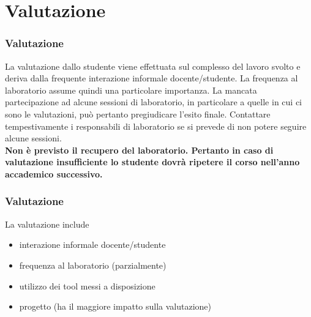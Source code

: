 \documentclass{beamer}
\begin{document}
\section{Valutazione}
\begin{frame}
\frametitle{Valutazione}
La valutazione dallo studente viene effettuata sul complesso del lavoro svolto e deriva dalla frequente interazione informale docente/studente. La frequenza al laboratorio assume quindi una particolare importanza. La mancata partecipazione ad alcune sessioni di laboratorio, in particolare a quelle in cui ci sono le valutazioni, pu\` o pertanto pregiudicare l'esito finale. Contattare tempestivamente i responsabili di laboratorio se si prevede di non potere seguire alcune sessioni.\\

\textbf{Non \`e previsto il recupero del laboratorio. Pertanto in caso di valutazione insufficiente lo studente dovr\`a ripetere il corso nell'anno accademico successivo.}
\end{frame}


\begin{frame}
\frametitle{Valutazione}
La valutazione include
\begin{itemize}
\item  interazione informale docente/studente
\item frequenza al laboratorio (parzialmente)
\item utilizzo dei tool messi a disposizione
\item progetto (ha il maggiore impatto sulla valutazione)
\end{itemize}
\end{frame}
\end{document}
